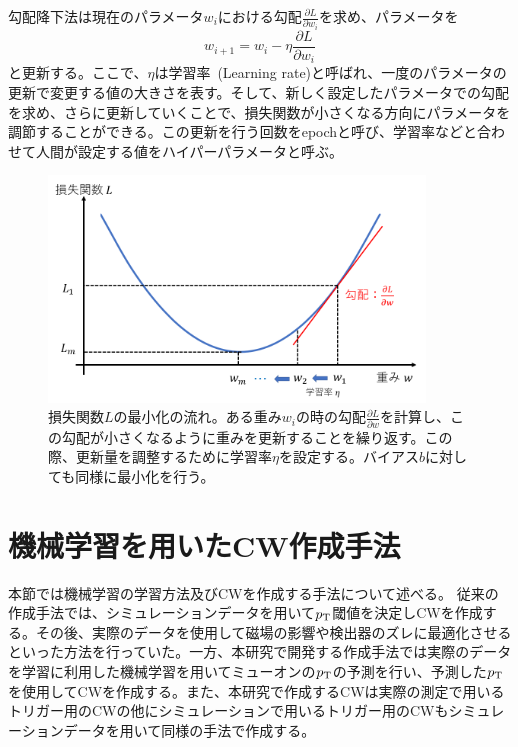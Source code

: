 勾配降下法は現在のパラメータ$w_i$における勾配$\frac{\partial L}{\partial w_i}$を求め、パラメータを
\begin{equation}
    w_{i+1} = w_i - \eta\frac{\partial L}{\partial w_i}
    \label{equ:勾配}
\end{equation}
と更新する。ここで、$\eta$は学習率~(Learning rate)と呼ばれ、一度のパラメータの更新で変更する値の大きさを表す。そして、新しく設定したパラメータでの勾配を求め、さらに更新していくことで、損失関数が小さくなる方向にパラメータを調節することができる。この更新を行う回数をepochと呼び、学習率などと合わせて人間が設定する値をハイパーパラメータと呼ぶ。


\begin{figure}[tb]
  \centering
  \includegraphics[clip, width=10cm]{fig/4/lossfunc_laerning.png}
  \caption{損失関数$L$の最小化の流れ。ある重み$w_i$の時の勾配$\frac{\partial L}{\partial w}$を計算し、この勾配が小さくなるように重みを更新することを繰り返す。この際、更新量を調整するために学習率$\eta$を設定する。バイアス$b$に対しても同様に最小化を行う。}
  \label{fig:lossfunction}
\end{figure}



\section{機械学習を用いたCW作成手法}
本節では機械学習の学習方法及びCWを作成する手法について述べる。
従来の作成手法では、シミュレーションデータを用いて$p_{\rm{T}}$閾値を決定しCWを作成する。その後、実際のデータを使用して磁場の影響や検出器のズレに最適化させるといった方法を行っていた。一方、本研究で開発する作成手法では実際のデータを学習に利用した機械学習を用いてミューオンの$p_{\rm{T}}$の予測を行い、予測した$p_{\rm{T}}$を使用してCWを作成する。また、本研究で作成するCWは実際の測定で用いるトリガー用のCWの他にシミュレーションで用いるトリガー用のCWもシミュレーションデータを用いて同様の手法で作成する。

